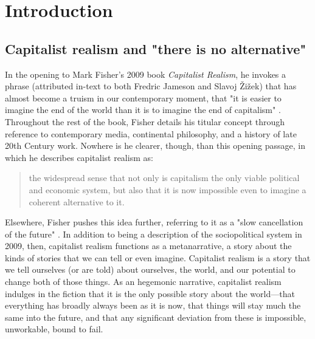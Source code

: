 \chapter{Introduction}
\label{ch:1}

\section{Capitalist realism and "there is no alternative"}
\label{sec:1-1}

In the opening to Mark Fisher's 2009 book \emph{Capitalist Realism}, he invokes a phrase (attributed in-text to both Fredric Jameson and Slavoj Žižek) that has almost become a truism in our contemporary moment, that "it is easier to imagine the end of the world than it is to imagine the end of capitalism" \citep[p. 2]{fisher_capitalist_2009}. Throughout the rest of the book, Fisher details his titular concept through reference to contemporary media, continental philosophy, and a history of late 20th Century work. Nowhere is he clearer, though, than this opening passage, in which he describes capitalist realism as:
\begin{quote}
the widespread sense that not only is capitalism the only viable political and economic system, but also that it is now impossible even to imagine a coherent alternative to it. \citep[p. 2]{fisher_capitalist_2009}
\end{quote}
Elsewhere, Fisher pushes this idea further, referring to it as a "slow cancellation of the future" \citeyearpar[p. 5]{fisher_ghosts_2014}. In addition to being a description of the sociopolitical system in 2009, then, capitalist realism functions as a metanarrative, a story about the kinds of stories that we can tell or even imagine. Capitalist realism is a story that we tell ourselves (or are told) about ourselves, the world, and our potential to change both of those things. As an hegemonic narrative, capitalist realism indulges in the fiction that it is the only possible story about the world—that everything has broadly always been as it is now, that things will stay much the same into the future, and that any significant deviation from these is impossible, unworkable, bound to fail. 

